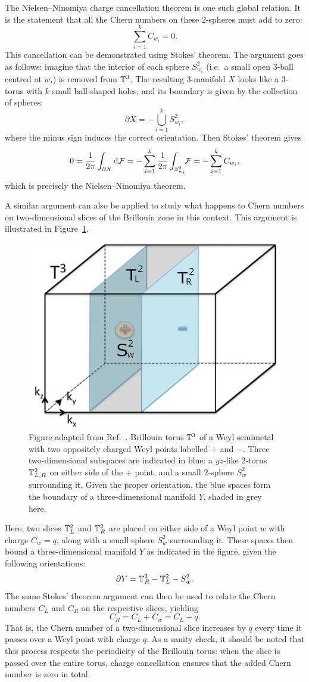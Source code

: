 The Nielsen--Ninomiya charge cancellation theorem is one such global relation. It is the statement that all the Chern numbers on these 2-spheres must add to zero:
\begin{equation}\label{eq:Nielsen-Ninomiya}
	\sum_{i=1}^{k}C_{w_i} = 0.
\end{equation}
This cancellation can be demonstrated using Stokes' theorem. The argument goes as follows: imagine that the interior of each sphere $S_{w_i}^2$ (i.e.\ a small open 3-ball centred at $w_i$) is removed from $\mathbb{T}^3$. The resulting 3-manifold $X$ looks like a 3-torus with $k$ small ball-shaped holes, and its boundary is given by the collection of spheres:
\[
	\partial X = -\bigcup_{i=1}^k S_{w_i}^2,
\]
where the minus sign induces the correct orientation. Then Stokes' theorem gives
\[
	0 = \frac{1}{2\pi}\int_{\partial X} \dd{\mathcal{F}} = -\sum_{i=1}^{k}\frac{1}{2\pi}\int_{S_{w_i}^2}\!\!\mathcal{F} = -\sum_{i=1}^{k}C_{w_i},
\]
which is precisely the Nielsen--Ninomiya theorem.

A similar argument can also be applied to study what happens to Chern numbers on two-dimensional slices of the Brillouin zone in this context. This argument is illustrated in Figure~\ref{fig:Weyl-point-Stokes}.
\begin{figure}[htb!]
	\centering
	\includegraphics[width=.5\linewidth]{Images/Weyl-point-Stokes}
	\caption{Figure adapted from Ref.~\cite{Mathai_math-review}. Brillouin torus $\mathbb{T}^3$ of a Weyl semimetal with two oppositely charged Weyl points labelled $+$ and $-$. Three two-dimensional subspaces are indicated in blue: a $yz$-like 2-torus $\mathbb{T}_{L,R}^2$ on either side of the $+$ point, and a small 2-sphere $S_w^2$ surrounding it. Given the proper orientation, the blue spaces form the boundary of a three-dimensional manifold $Y$, shaded in grey here.}
	\label{fig:Weyl-point-Stokes}
\end{figure}
Here, two slices $\mathbb{T}_L^2$ and $\mathbb{T}_R^2$ are placed on either side of a Weyl point $w$ with charge $C_w = q$, along with a small sphere $S_w^2$ surrounding it. These spaces then bound a three-dimensional manifold $Y$ as indicated in the figure, given the following orientations:
\[
	\partial Y = \mathbb{T}_R^2 - \mathbb{T}_L^2 - S_w^2.
\]
The same Stokes' theorem argument can then be used to relate the Chern numbers $C_L$ and $C_R$ on the respective slices, yielding
\[
	C_R = C_L + C_w = C_L + q.
\]
That is, the Chern number of a two-dimensional slice increases by $q$ every time it passes over a Weyl point with charge $q$. As a sanity check, it should be noted that this process respects the periodicity of the Brillouin torus: when the slice is passed over the entire torus, charge cancellation ensures that the added Chern number is zero in total.

